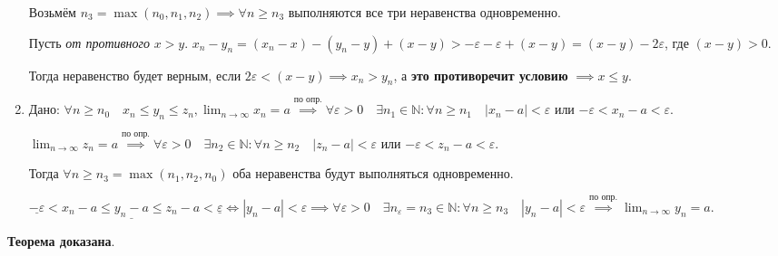 \documentclass{article}
\begin{document}
\begin{enumerate}
    Возьмём $n_3 = \max (n_0, n_1, n_2) \implies \forall n \ge n_3$ выполняются
    все три неравенства одновременно.

    Пусть \textit{от противного} $x > y$. 
    $x_n - y_n = (x_n - x) - (y_n - y) + (x - y) > 
    -\varepsilon - \varepsilon + (x - y) = (x - y) - 2 \varepsilon$, где $(x - y) > 0$.

    Тогда неравенство будет верным, если $2 \varepsilon < (x - y) \implies x_n > y_n$,
    а \textbf{это противоречит условию} $\implies x \le y$.

    \item Дано: $\forall n \ge n_0 \quad x_n \le y_n \le z_n, 
    \displaystyle\lim_{n \to \infty} x_n = a
    \stackrel{\text{по опр.}}{\implies}
    \forall \varepsilon > 0 \quad \exists n_1 \in \mathbb{N}:
    \forall n \ge n_1 \quad |x_n - a| < \varepsilon$ или
    $-\varepsilon < x_n - a < \varepsilon$.
    
    $\displaystyle\lim_{n \to \infty} z_n = a 
    \stackrel{\text{по опр.}}{\implies}
    \forall \varepsilon > 0 \quad \exists n_2 \in \mathbb{N}:
    \forall n \ge n_2 \quad |z_n - a| < \varepsilon$ или
    $-\varepsilon < z_n - a < \varepsilon$.

    Тогда $\forall n \ge n_3 = \max (n_1, n_2, n_0)$ оба неравенства
    будут выполняться одновременно.

    $\underline{-\varepsilon} < x_n - a \le \underline{y_n - a} \le
    z_n - a < \underline{\varepsilon} \Leftrightarrow |y_n - a| < \varepsilon
    \implies \forall \varepsilon > 0 \quad \exists n_\varepsilon = n_3 \in \mathbb{N}:
    \forall n \ge n_3 \quad |y_n - a| < \varepsilon
    \stackrel{\text{по опр.}}{\implies} 
    \displaystyle\lim_{n \to \infty} y_n = a$.
\end{enumerate}

\textbf{Теорема доказана}.
\end{document}
